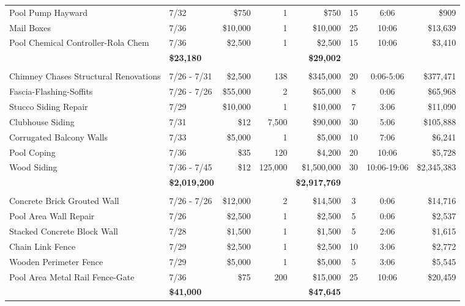 \documentclass[11pt,letterpaper]{article}
\begin{document}
\begin{longtable}{p{4.2cm} p{1.6cm} r r r c c r}
\rowcolor{blue!12} Pool Pump Hayward & 7/32 & \$750 & 1 & \$750 & 15 & 6:06 & \$909 \\
Mail Boxes & 7/36 & \$10,000 & 1 & \$10,000 & 25 & 10:06 & \$13,639 \\
\rowcolor{blue!12} Pool Chemical Controller-Rola Chem & 7/36 & \$2,500 & 1 & \$2,500 & 15 & 10:06 & \$3,410 \\
\addlinespace[1pt] \multicolumn{4}{r}{} & \textbf{\$23,180} & & & \textbf{\$29,002} \\
\addlinespace[6pt]
\multicolumn{8}{l}{\textbf{Exterior Surfaces}} \\
Chimney Chases Structural Renovations & 7/26 - 7/31 & \$2,500 & 138 & \$345,000 & 20 & 0:06-5:06 & \$377,471 \\
\rowcolor{blue!12} Fascia-Flashing-Soffits & 7/26 - 7/26 & \$55,000 & 2 & \$65,000 & 8 & 0:06 & \$65,968 \\
Stucco Siding Repair & 7/29 & \$10,000 & 1 & \$10,000 & 7 & 3:06 & \$11,090 \\
\rowcolor{blue!12} Clubhouse Siding & 7/31 & \$12 & 7,500 & \$90,000 & 30 & 5:06 & \$105,888 \\
Corrugated Balcony Walls & 7/33 & \$5,000 & 1 & \$5,000 & 10 & 7:06 & \$6,241 \\
\rowcolor{blue!12} Pool Coping & 7/36 & \$35 & 120 & \$4,200 & 20 & 10:06 & \$5,728 \\
Wood Siding & 7/36 - 7/45 & \$12 & 125,000 & \$1,500,000 & 30 & 10:06-19:06 & \$2,345,383 \\
\addlinespace[1pt] \multicolumn{4}{r}{} & \textbf{\$2,019,200} & & & \textbf{\$2,917,769} \\
\addlinespace[6pt]
\multicolumn{8}{l}{\textbf{Fences-Walls-Gates}} \\
\rowcolor{blue!12} Concrete Brick Grouted Wall & 7/26 - 7/26 & \$12,000 & 2 & \$14,500 & 3 & 0:06 & \$14,716 \\
Pool Area Wall Repair & 7/26 & \$2,500 & 1 & \$2,500 & 5 & 0:06 & \$2,537 \\
\rowcolor{blue!12} Stacked Concrete Block Wall & 7/28 & \$1,500 & 1 & \$1,500 & 5 & 2:06 & \$1,615 \\
Chain Link Fence & 7/29 & \$2,500 & 1 & \$2,500 & 10 & 3:06 & \$2,772 \\
\rowcolor{blue!12} Wooden Perimeter Fence & 7/29 & \$5,000 & 1 & \$5,000 & 5 & 3:06 & \$5,545 \\
Pool Area Metal Rail Fence-Gate & 7/36 & \$75 & 200 & \$15,000 & 25 & 10:06 & \$20,459 \\
\addlinespace[1pt] \multicolumn{4}{r}{} & \textbf{\$41,000} & & & \textbf{\$47,645} \\

\end{longtable}
\end{document}
